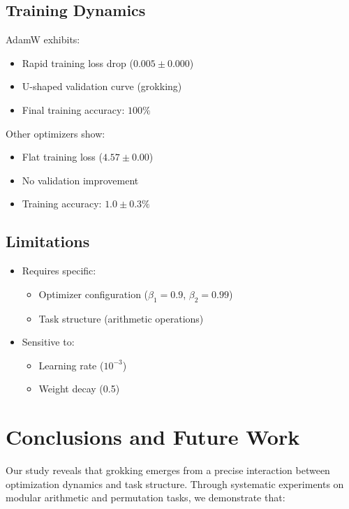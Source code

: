 \documentclass{article} %
\begin{document}
\subsection{Training Dynamics}
AdamW exhibits:
\begin{itemize}
    \item Rapid training loss drop ($0.005\pm0.000$)
    \item U-shaped validation curve (grokking)
    \item Final training accuracy: $100\%$
\end{itemize}

Other optimizers show:
\begin{itemize}
    \item Flat training loss ($4.57\pm0.00$)
    \item No validation improvement
    \item Training accuracy: $1.0\pm0.3\%$
\end{itemize}

\subsection{Limitations}
\begin{itemize}
    \item Requires specific:
    \begin{itemize}
        \item Optimizer configuration ($\beta_1=0.9$, $\beta_2=0.99$)
        \item Task structure (arithmetic operations)
    \end{itemize}
    \item Sensitive to:
    \begin{itemize}
        \item Learning rate ($10^{-3}$)
        \item Weight decay (0.5)
    \end{itemize}
\end{itemize}

\section{Conclusions and Future Work}
\label{sec:conclusion}

Our study reveals that grokking emerges from a precise interaction between optimization dynamics and task structure. Through systematic experiments on modular arithmetic and permutation tasks, we demonstrate that:
\end{document}
